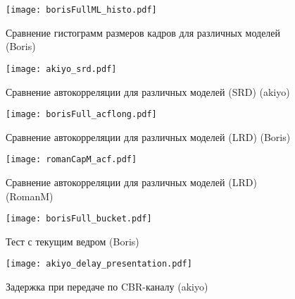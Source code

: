     \begin{figure}[h]
        \begin{center}
            \texttt{[image: borisFullML\_histo.pdf]}
        \end{center}
        \caption{Сравнение гистограмм размеров кадров для различных моделей (Boris)}
        \label{fig:borisFullMLhisto}
    \end{figure}

    \begin{figure}[h]
        \begin{center}
            \texttt{[image: akiyo\_srd.pdf]}
        \end{center}
        \caption{Сравнение автокорреляции для различных моделей (SRD) (akiyo)}
        \label{fig:akiyosrd}
    \end{figure}

    \begin{figure}[h]
        \begin{center}
            \texttt{[image: borisFull\_acflong.pdf]}
        \end{center}
        \caption{Сравнение автокорреляции для различных моделей (LRD) (Boris)}
        \label{fig:borisFullacflong}
    \end{figure}

    \begin{figure}[h]
        \begin{center}
            \texttt{[image: romanCapM\_acf.pdf]}
        \end{center}
        \caption{Сравнение автокорреляции для различных моделей (LRD) (RomanM)}
        \label{fig:romanCpamMacf}
    \end{figure}

    \begin{figure}[h]
        \begin{center}
            \texttt{[image: borisFull\_bucket.pdf]}
        \end{center}
        \caption{Тест с текущим ведром (Boris)}
        \label{fig:borisFullbucket}
    \end{figure}

    \begin{figure}[h]
        \begin{center}
            \texttt{[image: akiyo\_delay\_presentation.pdf]}
        \end{center}
        \caption{Задержка при передаче по CBR-каналу (akiyo)}
        \label{fig:akiyodelaypresentation}
    \end{figure}

